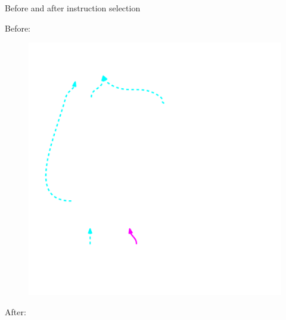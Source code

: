 
\begin{frame}{Before and after instruction selection}

\begin{minipage}[t]{0.50\linewidth}
    Before:
    \begin{figure}
        \vspace{-3.0ex}
        \includegraphics[width = 1.00\textwidth]{examples/ex1b/ex1b-pre-isel.pdf}
    \end{figure}
\end{minipage}
\begin{minipage}[t]{0.49\linewidth}
    After:
    \begin{figure}
        \vspace{-3.0ex}

\end{figure}
\end{minipage}
\end{frame}
